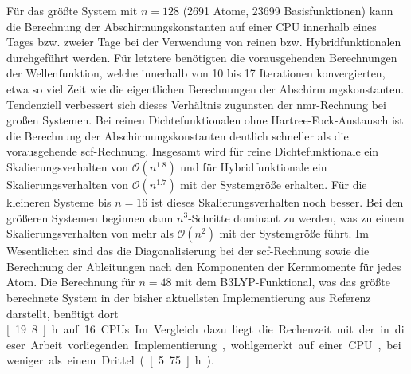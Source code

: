\FloatBarrier

Für das größte System mit $n=128$ (2691 Atome, 23699 Basisfunktionen) kann die Berechnung der Abschirmungskonstanten auf einer CPU innerhalb eines Tages bzw. zweier Tage bei der Verwendung von reinen bzw. Hybridfunktionalen durchgeführt werden. Für letztere benötigten die vorausgehenden Berechnungen der Wellenfunktion, welche innerhalb von 10 bis 17 Iterationen konvergierten, etwa so viel Zeit wie die eigentlichen Berechnungen der Abschirmungskonstanten. Tendenziell verbessert sich dieses Verhältnis zugunsten der \ac{nmr}-Rechnung bei großen Systemen. Bei reinen Dichtefunktionalen ohne Hartree-Fock-Austausch ist die Berechnung der Abschirmungskonstanten deutlich schneller als die vorausgehende \ac{scf}-Rechnung. Insgesamt wird für reine Dichtefunktionale ein Skalierungsverhalten von $\mathcal{O}(n^{1.8})$ und für Hybridfunktionale ein Skalierungsverhalten von $\mathcal{O}(n^{1.7})$ mit der Systemgröße erhalten. Für die kleineren Systeme bis $n=16$ ist dieses Skalierungsverhalten noch besser. Bei den größeren Systemen beginnen dann $n^3$-Schritte dominant zu werden, was zu einem Skalierungsverhalten von mehr als $\mathcal{O}(n^{2})$ mit der Systemgröße führt. Im Wesentlichen sind das die Diagonalisierung bei der \ac{scf}-Rechnung sowie die Berechnung der Ableitungen nach den Komponenten der Kernmomente für jedes Atom. Die Berechnung für $n=48$ mit dem B3LYP-Funktional, was das größte berechnete System in der bisher aktuellsten Implementierung aus Referenz \cite{kumar2016nuclei} darstellt, benötigt dort \unit[19.8]{h} auf 16 CPUs. Im Vergleich dazu liegt die Rechenzeit mit der in dieser Arbeit vorliegenden Implementierung, wohlgemerkt auf einer CPU, bei weniger als einem Drittel (\unit[5.75]{h}). 

